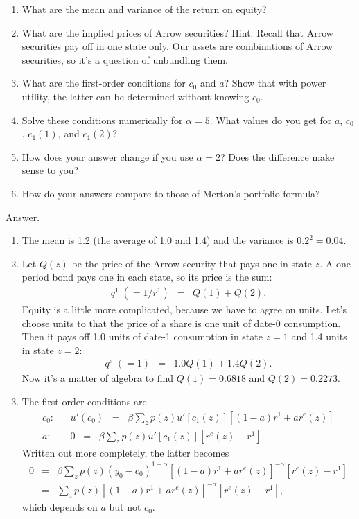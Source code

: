 \documentclass[11pt]{article}
\begin{document}
\begin{enumerate}
\begin{enumerate}
\item What are the mean and variance of the return on equity?
\item What are the implied prices of Arrow securities?
Hint:  Recall that Arrow securities pay off in one state only.
Our assets are combinations of Arrow securities,
so it's a question of unbundling them.
\item What are the first-order conditions for $c_0$ and $a$?
Show that with power utility,
the latter can be determined without knowing $c_0$.
\item Solve these conditions numerically for $\alpha = 5$.
What values do you get for $a$, $c_0$, $c_1(1)$, and $c_1(2)$?
\item How does your answer change if you use $\alpha = 2$?
Does the difference make sense to you?
\item How do your answers compare to those of Merton's portfolio formula?
\end{enumerate}
%
Answer.
\begin{enumerate}
\item The mean is 1.2 (the average of 1.0 and 1.4)
and the variance is $0.2^2 = 0.04$.

\item
Let $Q(z)$ be the price of the Arrow security that pays one
in state $z$.
A one-period bond pays one in each state, so its price is the sum:
\begin{eqnarray*}
    q^1 \; (=1/r^1)  &=&  Q(1) + Q(2)  .
\end{eqnarray*}
Equity is a little more complicated, because we have to agree on
units.  Let's choose units to that the price of a share is one
unit of date-0 consumption.
Then it pays off 1.0 units of date-1 consumption in state $z=1$
and 1.4 units in state $z=2$:
\begin{eqnarray*}
    q^e \; (=1)  &=&  1.0 Q(1) + 1.4 Q(2)  .
\end{eqnarray*}
Now it's a matter of algebra to find
$Q(1) = 0.6818$ and $Q(2) = 0.2273$.


\item The first-order conditions are
\begin{eqnarray*}
    c_0:  &&  u'(c_0) \;\;=\;\; \beta \sum_z p(z)
            u'[c_1(z)] [ (1-a)r^1 + a r^e(z)] \\
    a:    && 0 \;\;=\;\; \beta \sum_z p(z) u'[c_1(z)] [r^e(z) - r^1 ]  .
\end{eqnarray*}
Written out more completely, the latter becomes
\begin{eqnarray*}
    0 &=& \beta \sum_z p(z) (y_0-c_0)^{1-\alpha} [ (1-a)r^1 + a r^e(z)]^{-\alpha} [r^e(z) - r^1 ] \\
    &=&  \sum_z p(z) [ (1-a)r^1 + a r^e(z)]^{-\alpha} [r^e(z) - r^1 ] ,
\end{eqnarray*}
which depends on $a$ but not $c_0$.


\end{enumerate}
\end{enumerate}
\end{document}
